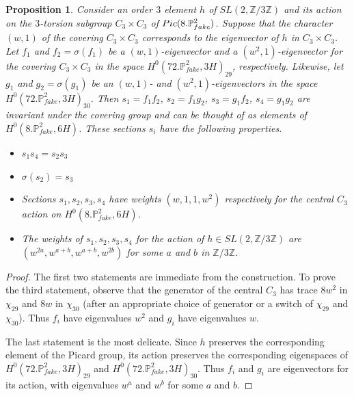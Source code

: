 \documentclass[10pt,a4paper]{amsart}
\newtheorem{proposition}{Proposition}
\def\FPP {{\P^2_{fake}}}
\def\P {{\mathbb P}}
\def\Z {{\mathbb Z}}
\begin{document}
\begin{proposition}\label{key}
Consider an order $3$ element $h$ of $SL(2,\Z/3\Z)$ and its action on the $3$-torsion  subgroup $C_3\times C_3$ of ${\rm Pic}(8.\FPP)$. Suppose that the 
character $(w,1)$ of the covering $C_3\times C_3$ corresponds to the eigenvector of $h$ in $C_3\times C_3$.
Let $f_1$ and $f_2 = \sigma(f_1)$ be a $(w,1)$-eigenvector and a  $(w^2,1)$-eigenvector for the covering $C_3\times C_3$ in the space $H^0(72.\FPP,3H)_{29}$, respectively.
Likewise, let $g_1$ and $g_2=\sigma(g_1)$ be an $(w,1)$- and $(w^2,1)$-eigenvectors  in the space $H^0(72.\FPP,3H)_{30}$. Then  $s_1 = f_1 f_2$, $s_2 = f_1 g_2$, $s_3 = g_1 f_2$, $s_4 = g_1 g_2 $
are invariant under the covering group and can be thought of as elements of $H^0(8.\FPP,6H)$. These sections $s_i$ have the following properties.
\begin{itemize}
\item
$
s_1s_4 = s_2 s_3
$ 
\item 
$\sigma(s_2) = s_3$
\item
Sections $s_1,s_2, s_3,s_4$ have weights $(w,1,1,w^2)$ respectively for the central $C_3$ action on $H^0(8.\FPP,6H)$. 
\item
The weights of $s_1,s_2,s_3,s_4$ for the action of $h\in SL(2,\Z/3\Z)$ are $(w^{2a},w^{a+b},w^{a+b},w^{2b})$ for some $a$ and $b$ in $\Z/3\Z$.
\end{itemize}
\end{proposition}

\begin{proof}
The first two statements are immediate from the construction. To prove the third statement, observe that the generator of the central $C_3$  has trace $8w^2$
in $\chi_{29}$ and $8w$ in $\chi_{30}$ (after an appropriate choice of generator or a switch of $\chi_{29}$ and $\chi_{30}$). Thus $f_i$ have eigenvalues $w^2$ and $g_i$ have eigenvalues $w$. 

\medskip
The last statement is the most delicate. Since $h$ preserves the corresponding element of the Picard group, its action preserves the corresponding eigenspaces of $H^0(72.\FPP,3H)_{29}$ and $H^0(72.\FPP,3H)_{30}$. Thus $f_i$ and $g_i$ are eigenvectors for its action, with eigenvalues $w^a$ and $w^b$ for some $a$ and $b$.
\end{proof}
\end{document}

